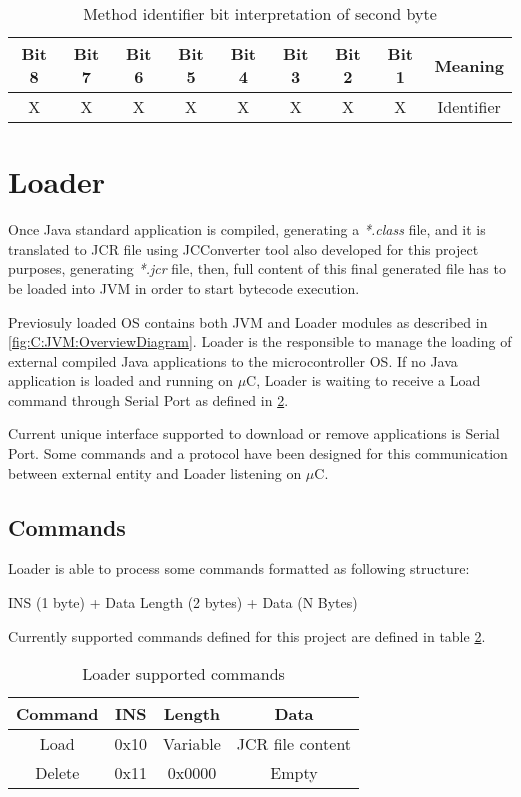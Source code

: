 \begin{table}[!htb]
\centering
\begin{tabular}{|c|c|c|c|c|c|c|c|c|}
\hline 
Bit 8 & Bit 7 & Bit 6 & Bit 5 & Bit 4 & Bit 3 & Bit 2 & Bit 1 & Meaning \\ 
\hline 
X & X & X & X & X & X & X & X & Identifier \\ 
\hline 
\end{tabular}
\caption{Method identifier bit interpretation of second byte}
\label{tab:SS:JVM:JCR:TransBytecodes}
\end{table}

\section{Loader}\label{S:JVM:Loader}
Once Java standard application is compiled, generating a \textit{*.class} file, and it is translated to JCR file using JCConverter tool also developed for this project purposes, generating \textit{*.jcr} file, then, full content of this final generated file has to be loaded into JVM in order to start bytecode execution.

Previosuly loaded OS contains both JVM and Loader modules as described in \ref{fig:C:JVM:OverviewDiagram}. Loader is the responsible to manage the loading of external compiled Java applications to the microcontroller OS. If no Java application is loaded and running on $\mu$C, Loader is waiting to receive a Load command through Serial Port as defined in \ref{tab:SS:JVM:Loader:Commands}.

Current unique interface supported to download or remove applications is Serial Port. Some commands and a protocol have been designed for this communication between external entity and Loader listening on $\mu$C.

\subsection{Commands}\label{SS:JVM:Loader:Commands}
Loader is able to process some commands formatted as following structure:

\begin{center}
INS (1 byte) + Data Length (2 bytes) + Data (N Bytes)
\end{center}

Currently supported commands defined for this project are defined in table \ref{tab:SS:JVM:Loader:Commands}.

\begin{table}[!htb]
\centering
\begin{tabular}{|c|c|c|c|}
\hline 
Command & INS & Length & Data \\ 
\hline 
Load & 0x10 & Variable & JCR file content \\ 
\hline 
Delete & 0x11 & 0x0000 & Empty \\ 
\hline 
\end{tabular}
\caption{Loader supported commands}
\label{tab:SS:JVM:Loader:Commands}
\end{table}

